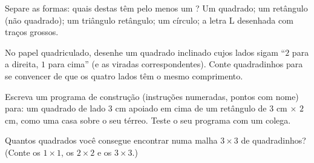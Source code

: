 \begin{exercise}[$\star$]\label{exo:g3:shapes:8}
Separe as formas: quais destas têm pelo menos um ? Um
quadrado; um retângulo (não quadrado); um triângulo retângulo; um
círculo; a letra L desenhada com traços grossos.
\end{exercise}

\begin{exercise}[$\star\star$]\label{exo:g3:shapes:9}
No papel quadriculado, desenhe um quadrado inclinado cujos lados
sigam ``$2$ para a direita, $1$ para cima'' (e as viradas
correspondentes). Conte quadradinhos para se convencer de que os
quatro lados têm o mesmo comprimento.
\end{exercise}

\begin{exercise}[$\star\star$]\label{exo:g3:shapes:10}
Escreva um programa de construção (instruções numeradas, pontos com
nome) para: um quadrado de lado $3$ cm apoiado em cima de um
retângulo de $3$ cm $\times$ $2$ cm, como uma casa sobre o seu térreo.
Teste o seu programa com um colega.
\end{exercise}

\begin{exercise}[$\star\star$]\label{exo:g3:shapes:11}
Quantos quadrados você consegue encontrar numa malha $3 \times 3$ de
quadradinhos? (Conte os $1 \times 1$, os $2 \times 2$ e os
$3 \times 3$.)
\end{exercise}

